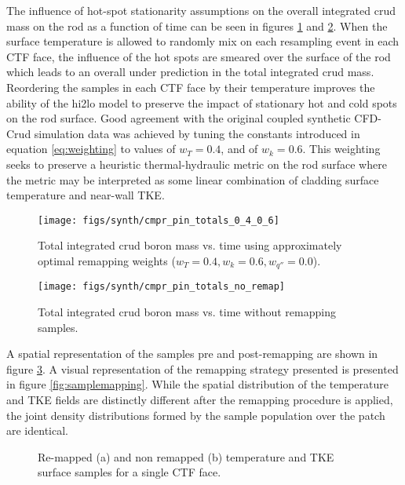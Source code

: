 The influence of hot-spot stationarity assumptions on the overall integrated crud mass on the rod as a function of time can be seen in figures \ref{fig:cmprpintotals0406} and \ref{fig:cmprpintotalsnoremap}.  When the surface temperature is allowed to randomly mix on each resampling event in each CTF face, the influence of the hot spots are smeared over the surface of the rod which leads to an overall under prediction in the total integrated crud mass.  Reordering the samples in each CTF face by their temperature improves the ability of the hi2lo model to preserve the impact of stationary hot and cold spots on the rod surface.  Good agreement with the original coupled synthetic CFD-Crud simulation data was achieved by tuning the constants introduced in equation \ref{eq:weighting} to values of $w_T = 0.4$, and of $w_k = 0.6$.  This weighting seeks to preserve a heuristic thermal-hydraulic metric on the rod surface  where the metric may be interpreted as some linear combination of cladding surface temperature and near-wall TKE.


\begin{figure}[H]
    \centering
    \texttt{[image: figs/synth/cmpr\_pin\_totals\_0\_4\_0\_6]}
    \caption[Total integrated crud boron mass vs. time using approximately optimal remapping weights.]{Total integrated crud boron mass vs. time using approximately optimal remapping weights ($w_T=0.4, w_{k}=0.6, w_{q''}=0.0$).}
    \label{fig:cmprpintotals0406}
\end{figure}
\begin{figure}[H]
    \centering
    \texttt{[image: figs/synth/cmpr\_pin\_totals\_no\_remap]}
    \caption{Total integrated crud boron mass vs. time without remapping samples.}
    \label{fig:cmprpintotalsnoremap}
\end{figure}

A spatial representation of the samples pre and post-remapping are shown in figure \ref{fig:remmap_comp}.  A visual representation of the remapping strategy presented is presented in figure \ref{fig:samplemapping}.  While the spatial distribution of the temperature and TKE fields are distinctly different after the remapping procedure is applied, the joint density distributions formed by the sample population over the patch are identical.

\begin{figure}[H]%
    \centering
    \hspace*{-1.0em}%
    \caption[Re-mapped and non-remapped temperature and TKE surface samples]{Re-mapped (a) and non remapped (b) temperature and TKE surface samples for a single CTF face.}%
    \label{fig:remmap_comp}%
\end{figure}

